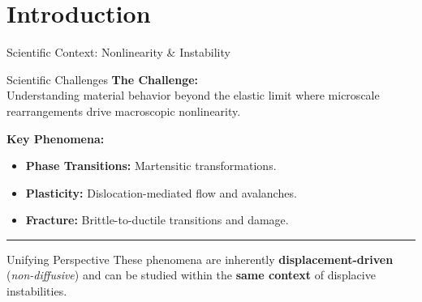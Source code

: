 \documentclass[10pt, aspectratio=169]{beamer}
\begin{document}
\section{Introduction}
\begin{frame}{Scientific Context: Nonlinearity \& Instability}
    \begin{block}{Scientific Challenges}
        \vspace{0.1cm}
        \textbf{\color{AcademicNavy} The Challenge:}\\[0.1cm]
        Understanding material behavior beyond the elastic limit where microscale rearrangements drive macroscopic nonlinearity.
        
        \vspace{0.3cm}
        \textbf{\color{AcademicNavy} Key Phenomena:}
        \begin{itemize}
            \item \textbf{Phase Transitions:} Martensitic transformations.
            \item \textbf{Plasticity:} Dislocation-mediated flow and avalanches.
            \item \textbf{Fracture:} Brittle-to-ductile transitions and damage.
        \end{itemize}
    \end{block}

    \vfill
    {\centering\color{AcademicNavy!30}\rule{0.6\textwidth}{0.4pt}\par}
    \vfill

    \begin{center}
        \begin{minipage}{0.85\textwidth}
            \begin{block}{Unifying Perspective}
                \centering
                \vspace{0.1cm}
                These phenomena are inherently \textbf{\color{AcademicNavy} displacement-driven} (\textit{non-diffusive}) and can be studied within the \textbf{same context} of displacive instabilities.
            \end{block}
        \end{minipage}
    \end{center}
\end{frame}
\end{document}
